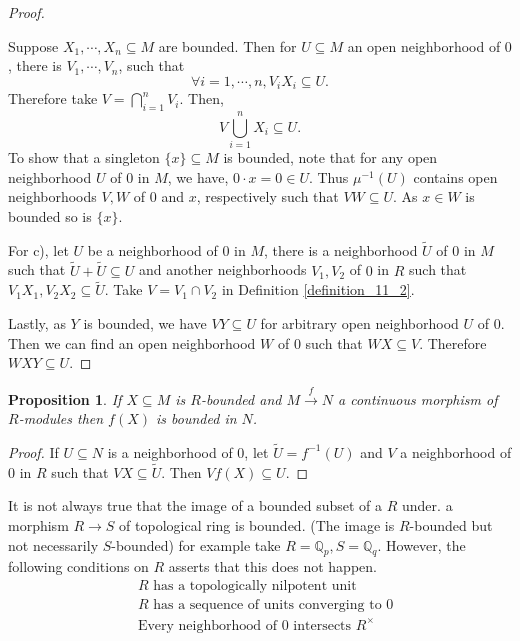 \documentclass[8pt]{article}
\numberwithin{equation}{section}
\newtheorem{proposition}{Proposition}[subsection]
\newcommand{\Q}[0]{\mathbb{Q}}
\begin{document}
\begin{proof}$\:$
    \par Suppose $X_1,\cdots,X_n\subseteq M$ are bounded. Then for $U\subseteq M$ an open neighborhood of $0$, there is $V_1,\cdots,V_n$, such that 
    \begin{equation*}
    \forall i=1,\cdots,n, V_i X_i \subseteq U.
    \end{equation*}
    Therefore take $V=\bigcap_{i=1}^n V_i$. Then, 
    \begin{equation*}
    V\bigcup_{i=1}^n X_i \subseteq U.
    \end{equation*}
    To show that a singleton $\{x\}\subseteq M$ is bounded, note that for any open neighborhood $U$ of $0$ in $M$, we have, $0\cdot x =0\in U$. Thus $\mu^{-1}(U)$ contains open neighborhoods $V,W$ of $0$ and $x$, respectively such that $VW\subseteq U$. As $x\in W$ is bounded so is $\{x\}$.
    \par For c), let $U$ be a neighborhood of $0$ in $M$, there is a neighborhood $\tilde{U}$ of $0$ in $M$ such that $\tilde{U}+\tilde{U}\subseteq U$ and another neighborhoods $V_1,V_2$ of $0$ in $R$ such that $V_1X_1,V_2X_2\subseteq \tilde{U}$. Take $V = V_1\cap V_2$ in Definition \ref{definition_11_2}.
    \par Lastly, as $Y$ is bounded, we have $VY\subseteq U$ for arbitrary open neighborhood $U$ of $0$. Then we can find an open neighborhood $W$ of $0$ such that $WX\subseteq V$. Therefore $WXY\subseteq U$.
\end{proof}
\begin{proposition}
    \label{fact_3_another}
    If $X\subseteq M$ is $R$-bounded and $M\stackrel{f}{\to}N$ a continuous morphism of $R$-modules then $f(X)$ is bounded in $N$.
\end{proposition}
\begin{proof}
    If $U\subseteq N$ is a neighborhood of $0$, let $\tilde{U} = f^{-1}(U)$ and $V$ a neighborhood of $0$ in $R$ such that $VX\subseteq\tilde{U}$. Then $Vf(X)\subseteq U$.
\end{proof}
It is not always true that the image of a bounded subset of a $R$ under. a morphism $R\to S$ of topological ring is bounded. (The image is $R$-bounded but not necessarily $S$-bounded) for example take $R=\Q_p,S=\Q_q$. However, the following conditions on $R$ asserts that this does not happen.
\begin{align*}
    &\text{$R$ has a topologically nilpotent unit}\tag{T}\label{T}\\
    &\text{$R$ has a sequence of units converging to $0$}\tag{H}\label{H}\\
    &\text{Every neighborhood of $0$ intersects $R^\times$}\tag{E}\label{E}
\end{align*}
\end{document}
